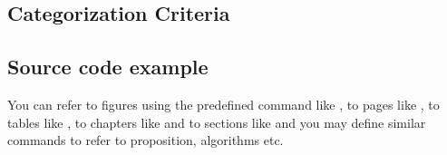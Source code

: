 \subsection{Categorization Criteria}


\subsection{Source code example}



You can refer to figures using the predefined command like , to pages like , to tables like , to chapters like  and to sections like  and you may define similar commands to refer to proposition, algorithms etc.
